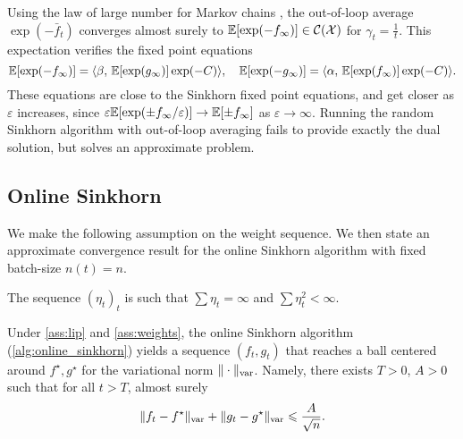 Using the law of large number for Markov chains
\citep{breiman_strong_1960}, the out-of-loop average $\exp(-\bar f_t)$
converges almost surely to $\mathbb{E}[\exp(-f_\infty)]
 \in \mathcal{C}(\mathcal{X})$ for $\gamma_t = 
 \frac{1}{t}$. This expectation verifies the fixed point equations
\begin{equation}
    \mathbb{E}[\exp(-f_\infty)] =
     \langle \beta,\,\mathbb{E}[\exp(g_\infty)] \exp(-C)\rangle,\quad
    \mathbb{E}[\exp(-g_\infty)] =
     \langle \alpha,\,\mathbb{E}[\exp(f_\infty)] \exp(-C)\rangle.
\end{equation}
These equations are close to the Sinkhorn fixed point equations, and
get closer as $\varepsilon$ increases, since $\varepsilon \mathbb{E}[\exp(\pm f_\infty /
\varepsilon)] \to \mathbb{E}[\pm f_\infty]$ as $\varepsilon \to \infty$. Running the random
Sinkhorn algorithm with out-of-loop averaging fails to provide exactly the dual solution, but solves an approximate problem.
%

\subsection{Online Sinkhorn}

We make the following \citet{robbins1951stochastic} assumption on the weight sequence. We then state an approximate convergence result for the online Sinkhorn algorithm with fixed batch-size $n(t) = n$.

\begin{assumption}\label{ass:weights}
    The sequence ${(\eta_t)}_t$ is such that
    $\sum \eta_t = \infty$ and $\sum \eta_t^2 < \infty$.
\end{assumption}

\begin{proposition}\label{prop:convergence_approx}
    Under \autoref{ass:lip} and \ref{ass:weights}, the online Sinkhorn algorithm (\autoref{alg:online_sinkhorn}) yields a sequence $(f_t, g_t)$ that reaches a
    ball centered around $f^\star, g^\star$ for the variational norm $\Vert
    \cdot \Vert_{\text{\upshape var}}$.
     Namely, there exists $T > 0$, $A > 0$ such that for all $t > T$, almost surely
    \begin{equation}
        \Vert f_t - f^\star \Vert_{\text{\upshape var}}
        + \Vert g_t - g^\star \Vert_{\text{\upshape var}} 
        \leqslant \frac{A}{\sqrt{n}} .
    \end{equation}
\end{proposition}

